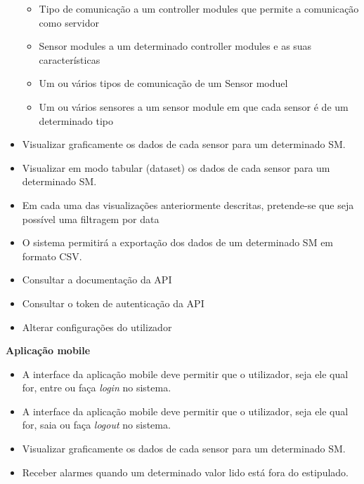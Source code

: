 \begin{itemize}
\begin{itemize}
		\item Tipo de comunicação a um controller modules que permite a comunicação como servidor 
		
		\item Sensor modules a um determinado controller modules e as suas características 
		
		\item Um ou vários tipos de comunicação de um Sensor moduel
		
		\item Um ou vários sensores a um sensor module em que cada sensor é de um determinado tipo 
		
	\end{itemize}
	
	\item Visualizar graficamente os dados de cada sensor para um determinado \ac{SM}. 
	
	
	\item Visualizar em modo tabular (dataset) os dados de cada sensor para um determinado \ac{SM}. 
	
	\item Em cada uma das visualizações anteriormente descritas, pretende-se que seja possível uma filtragem por data
	
	
	\item O sistema permitirá a exportação dos dados de um determinado \ac{SM} em formato \ac{CSV}. 
	
	
	\item  Consultar a documentação da API 
	
	\item Consultar o token de autenticação da API 
	
	
	\item Alterar configurações do utilizador 
	
	
	
\end{itemize}


\textbf{Aplicação mobile}



\begin{itemize}
	\item A interface da aplicação mobile deve permitir que o utilizador, seja ele qual for, entre ou faça \textit{login} no sistema. 
	
	\item A interface da aplicação mobile deve permitir que o utilizador, seja ele qual for, saia ou faça \textit{logout} no sistema.
	
	
	\item Visualizar graficamente os dados de cada sensor para um determinado \ac{SM}. 
	
	\item Receber alarmes quando um determinado valor lido está fora do estipulado.
	
	
\end{itemize}



